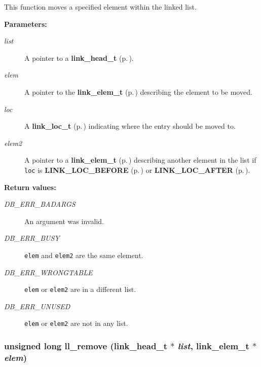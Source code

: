  This function moves a specified element within the linked list.\begin{Desc}
\item[{\bf Parameters: }]\par
\begin{description}
\item[
{\em list}]A pointer to a {\bf link\_\-head\_\-t} {\rm (p.\,\pageref{group__dbprim__link_a0})}. \item[
{\em elem}]A pointer to the {\bf link\_\-elem\_\-t} {\rm (p.\,\pageref{group__dbprim__link_a1})} describing the element to be moved. \item[
{\em loc}]A {\bf link\_\-loc\_\-t} {\rm (p.\,\pageref{group__dbprim__link_a4})} indicating where the entry should be moved to. \item[
{\em elem2}]A pointer to a {\bf link\_\-elem\_\-t} {\rm (p.\,\pageref{group__dbprim__link_a1})} describing another element in the list if {\tt loc} is {\bf LINK\_\-LOC\_\-BEFORE} {\rm (p.\,\pageref{group__dbprim__link_a26a100})} or {\bf LINK\_\-LOC\_\-AFTER} {\rm (p.\,\pageref{group__dbprim__link_a26a101})}.\end{description}
\end{Desc}
\begin{Desc}
\item[{\bf Return values: }]\par
\begin{description}
\item[
{\em DB\_\-ERR\_\-BADARGS}]An argument was invalid. \item[
{\em DB\_\-ERR\_\-BUSY}]{\tt elem} and {\tt elem2} are the same element. \item[
{\em DB\_\-ERR\_\-WRONGTABLE}]{\tt elem} or {\tt elem2} are in a different list. \item[
{\em DB\_\-ERR\_\-UNUSED}]{\tt elem} or {\tt elem2} are not in any list. \end{description}
\end{Desc}
\subsubsection{\setlength{\rightskip}{0pt plus 5cm}unsigned long ll\_\-remove ({\bf link\_\-head\_\-t} $\ast$ {\em list}, {\bf link\_\-elem\_\-t} $\ast$ {\em elem})}\label{group__dbprim__link_a8}




